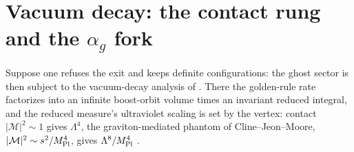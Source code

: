 \documentclass[11pt]{article}
\theoremstyle{definition}
\theoremstyle{remark}
\newcommand{\ag}{\alpha_g}
\begin{document}
\section{Vacuum decay: the contact rung and the $\ag$ fork}
\label{sec:rate}

Suppose one refuses the exit and keeps definite configurations: the
ghost sector is then subject to the vacuum-decay analysis of
\cite{instantaneous}. There the golden-rule rate factorizes into an
infinite boost-orbit volume times an invariant reduced integral, and
the reduced measure's ultraviolet scaling is set by the vertex:
contact $|\mathcal M|^{2}\sim1$ gives $\Lambda^{4}$, the
graviton-mediated phantom of Cline--Jeon--Moore,
$|\mathcal M|^{2}\sim s^{2}/M_{\rm Pl}^{4}$, gives
$\Lambda^{8}/M_{\rm Pl}^{4}$ \cite{CJM2004,instantaneous}.
\end{document}
